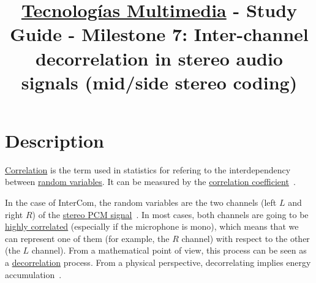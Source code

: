 \title{\href{https://www.ual.es/estudios/grados/presentacion/plandeestudios/asignatura/4015/40154321?idioma=zh_CN}{Tecnologías Multimedia} - Study Guide - Milestone 7: Inter-channel decorrelation in stereo audio signals (mid/side stereo coding)}

\maketitle

\section{Description}

\href{https://en.wikipedia.org/wiki/Correlation_and_dependence}{Correlation}
is the term used in statistics for refering to the interdependency
between \href{https://en.wikipedia.org/wiki/Random_variable}{random
  variables}. It can be measured by the
\href{https://www.mathsisfun.com/data/correlation.html}{correlation
  coefficient}~\cite{thinkstats}.

In the case of InterCom, the random variables are the two channels
(left $L$ and right $R$) of the
\href{https://en.wikipedia.org/wiki/Stereophonic_sound}{stereo
  \href{https://en.wikipedia.org/wiki/Pulse-code_modulation}{PCM}
  signal}~\cite{bosi2003intro}. In most cases, both channels are going
to be \href{https://en.wikipedia.org/wiki/Binaural_recording}{highly
  correlated} (especially if the microphone is mono), which means that
we can represent one of them (for example, the $R$ channel) with
respect to the other (the $L$ channel). From a mathematical point of
view, this process can be seen as a
\href{https://en.wikipedia.org/wiki/Decorrelation}{decorrelation}
process. From a physical perspective, decorrelating implies energy
accumulation~\cite{sayood2017introduction}.

